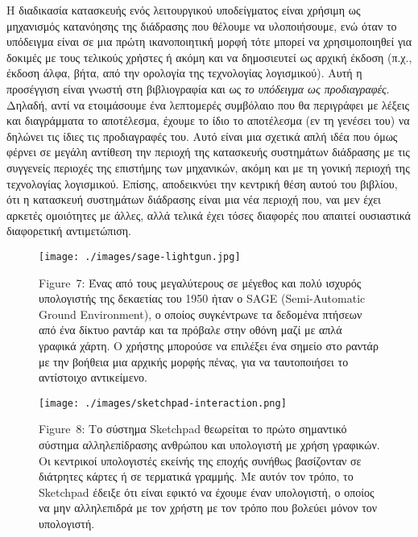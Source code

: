 \documentclass[
]{article}
\begin{document}
Η διαδικασία κατασκευής ενός λειτουργικού υποδείγματος είναι χρήσιμη ως
μηχανισμός κατανόησης της διάδρασης που θέλουμε να υλοποιήσουμε, ενώ
όταν το υπόδειγμα είναι σε μια πρώτη ικανοποιητική μορφή τότε μπορεί να
χρησιμοποιηθεί για δοκιμές με τους τελικούς χρήστες ή ακόμη και να
δημοσιευτεί ως αρχική έκδοση (π.χ., έκδοση άλφα, βήτα, από την ορολογία
της τεχνολογίας λογισμικού). Αυτή η προσέγγιση είναι γνωστή στη
βιβλιογραφία και ως \emph{το υπόδειγμα ως προδιαγραφές}. Δηλαδή, αντί να
ετοιμάσουμε ένα λεπτομερές συμβόλαιο που θα περιγράφει με λέξεις και
διαγράμματα το αποτέλεσμα, έχουμε το ίδιο το αποτέλεσμα (εν τη γενέσει
του) να δηλώνει τις ίδιες τις προδιαγραφές του. Αυτό είναι μια σχετικά
απλή ιδέα που όμως φέρνει σε μεγάλη αντίθεση την περιοχή της κατασκευής
συστημάτων διάδρασης με τις συγγενείς περιοχές της επιστήμης των
μηχανικών, ακόμη και με τη γονική περιοχή της τεχνολογίας λογισμικού.
Επίσης, αποδεικνύει την κεντρική θέση αυτού του βιβλίου, ότι η κατασκευή
συστημάτων διάδρασης είναι μια νέα περιοχή που, ναι μεν έχει αρκετές
ομοιότητες με άλλες, αλλά τελικά έχει τόσες διαφορές που απαιτεί
ουσιαστικά διαφορετική αντιμετώπιση.

\leavevmode{}%
\begin{figure}
\hypertarget{fig:sage-lightgun}{%
\centering
\texttt{[image: ./images/sage-lightgun.jpg]}
\caption{Figure~7: Ένας από τους μεγαλύτερους σε μέγεθος και πολύ
ισχυρός υπολογιστής της δεκαετίας του 1950 ήταν ο SAGE (Semi-Automatic
Ground Environment), ο οποίος συγκέντρωνε τα δεδομένα πτήσεων από ένα
δίκτυο ραντάρ και τα πρόβαλε στην οθόνη μαζί με απλά γραφικά χάρτη. Ο
χρήστης μπορούσε να επιλέξει ένα σημείο στο ραντάρ με την βοήθεια μια
αρχικής μορφής πένας, για να ταυτοποιήσει το αντίστοιχο
αντικείμενο.}\label{fig:sage-lightgun}
}
\end{figure}

\leavevmode{}%
\begin{figure}
\hypertarget{fig:sketchpad-interaction}{%
\centering
\texttt{[image: ./images/sketchpad-interaction.png]}
\caption{Figure~8: Το σύστημα Sketchpad θεωρείται το πρώτο σημαντικό
σύστημα αλληλεπίδρασης ανθρώπου και υπολογιστή με χρήση γραφικών. Οι
κεντρικοί υπολογιστές εκείνής της εποχής συνήθως βασίζονταν σε διάτρητες
κάρτες ή σε τερματικά γραμμής. Με αυτόν τον τρόπο, το Sketchpad έδειξε
ότι είναι εφικτό να έχουμε έναν υπολογιστή, ο οποίος να μην αλληλεπιδρά
με τον χρήστη με τον τρόπο που βολεύει μόνον τον
υπολογιστή.}\label{fig:sketchpad-interaction}
}
\end{figure}
\end{document}
